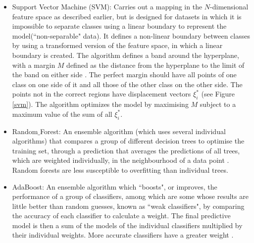 \documentclass[12pt]{article}
\begin{document}
\begin{itemize}
\item Support Vector Machine (SVM): Carries out a mapping in the $N$-dimensional feature space as described earlier, but is designed for datasets in which it is impossible to separate classes using a linear boundary to represent the model(``non-separable" data). It defines a non-linear boundary between classes by using a transformed version of the feature space, in which a linear boundary is created. The algorithm defines a band around the hyperplane, with a margin $M$ defined as the distance from the hyperplane to the limit of the band on either side \cite{friedman2001elements}. The perfect margin should have all points of one class on one side of it and all those of the other class on the other side. The points not in the correct regions have displacement vectors $\xi_{i}^{*}$ (see Figure \ref{svm}). The algorithm optimizes the model by maximising $M$ subject to a maximum value of the sum of all $\xi_{i}^{*}$.

\item Random$\_$Forest: An ensemble algorithm (which uses several individual algorithms) that compares a group of different decision trees to optimise the training set, through a prediction that averages the predictions of all trees, which are weighted individually, in the neighbourhood of a data point \cite{friedman2001elements}. Random forests are less susceptible to overfitting than individual trees.

\item AdaBoost: An ensemble algorithm which ``boosts", or improves, the performance of a group of classifiers, among which are some whose results are little better than random guesses, known as ``weak classifiers", by comparing the accuracy of each classifier to calculate a weight. The final predictive model is then a sum of the models of the individual classifiers multiplied by their individual weights. More accurate classifiers have a greater weight \cite{friedman2001elements}.
\end{itemize}
\end{document}
